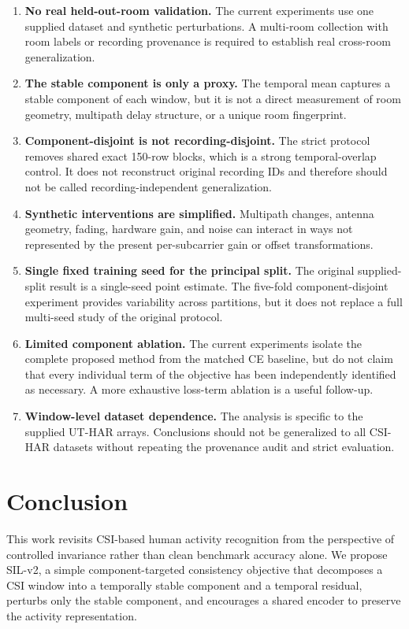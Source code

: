 \documentclass[runningheads]{llncs}
\newcommand{\method}{SIL-v2}
\begin{document}
\begin{enumerate}[leftmargin=*]
    \item \textbf{No real held-out-room validation.} The current experiments use one supplied dataset and synthetic perturbations. A multi-room collection with room labels or recording provenance is required to establish real cross-room generalization.
    \item \textbf{The stable component is only a proxy.} The temporal mean captures a stable component of each window, but it is not a direct measurement of room geometry, multipath delay structure, or a unique room fingerprint.
    \item \textbf{Component-disjoint is not recording-disjoint.} The strict protocol removes shared exact 150-row blocks, which is a strong temporal-overlap control. It does not reconstruct original recording IDs and therefore should not be called recording-independent generalization.
    \item \textbf{Synthetic interventions are simplified.} Multipath changes, antenna geometry, fading, hardware gain, and noise can interact in ways not represented by the present per-subcarrier gain or offset transformations.
    \item \textbf{Single fixed training seed for the principal split.} The original supplied-split result is a single-seed point estimate. The five-fold component-disjoint experiment provides variability across partitions, but it does not replace a full multi-seed study of the original protocol.
    \item \textbf{Limited component ablation.} The current experiments isolate the complete proposed method from the matched CE baseline, but do not claim that every individual term of the objective has been independently identified as necessary. A more exhaustive loss-term ablation is a useful follow-up.
    \item \textbf{Window-level dataset dependence.} The analysis is specific to the supplied UT-HAR arrays. Conclusions should not be generalized to all CSI-HAR datasets without repeating the provenance audit and strict evaluation.
\end{enumerate}

\section{Conclusion}

This work revisits CSI-based human activity recognition from the perspective of controlled invariance rather than clean benchmark accuracy alone. We propose \method{}, a simple component-targeted consistency objective that decomposes a CSI window into a temporally stable component and a temporal residual, perturbs only the stable component, and encourages a shared encoder to preserve the activity representation.
\end{document}
